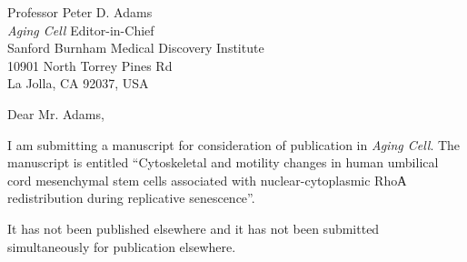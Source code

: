 \documentclass[11pt]{letter} %
\begin{document}

\begin{letter}{
Professor Peter D. Adams \\
\emph{Aging Cell} Editor-in-Chief \\
Sanford Burnham Medical Discovery Institute \\
10901 North Torrey Pines Rd \\
La Jolla, CA 92037, USA\\}

\iffalse
\begin{center}
\large\bf Dr. Danila Bobkov \\ %
4 Tikhoretsky\\ St-Petersburg, Russia 195251 \\ (999) 043-5439 %
\end{center}
\vfill
\fi
\signature{Dr. Danila Bobkov \\
Institute of Cytology RAS \\
4 Tikhoretsky ave. \\
St-Petersburg, 194064, Russia \\
Tel. :+7(999) 043-5439 \\
E-mail: bobkov@incras.ru} %


\opening{Dear Mr. Adams,}

I am submitting a manuscript for consideration of publication in \emph{Aging Cell}.
The manuscript is entitled “Cytoskeletal and motility changes in human umbilical cord mesenchymal stem cells associated with nuclear-cytoplasmic RhoА redistribution during replicative senescence”.

It has not been published elsewhere and it has not been submitted simultaneously for publication elsewhere.


\end{letter}
\end{document}

